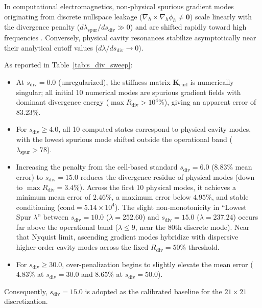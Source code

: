 \documentclass[VANCOUVER]{USG}
\begin{document}
In computational electromagnetics, non-physical spurious gradient modes originating from discrete nullspace leakage ($\nabla_h \times \nabla_h \phi_h \neq \mathbf{0}$) scale linearly with the divergence penalty ($d\lambda_{\mathrm{spur}} / ds_{\mathrm{div}} \gg 0$) and are shifted rapidly toward high frequencies \cite{jin2014finite, costabel2002weighted, bossavit1990spurious}. Conversely, physical cavity resonances stabilize asymptotically near their analytical cutoff values ($d\lambda / ds_{\mathrm{div}} \to 0$).

As reported in Table~\ref{tab:s_div_sweep}:
\begin{itemize}
    \item At $s_{\mathrm{div}} = 0.0$ (unregularized), the stiffness matrix $\mathbf{K}_{\mathrm{curl}}$ is numerically singular; all initial 10 numerical modes are spurious gradient fields with dominant divergence energy ($\max R_{\mathrm{div}} > 10^4\%$), giving an apparent error of $83.23\%$.
    \item For $s_{\mathrm{div}} \ge 4.0$, all 10 computed states correspond to physical cavity modes, with the lowest spurious mode shifted outside the operational band ($\lambda_{\mathrm{spur}} > 78$).
    \item Increasing the penalty from the cell-based standard $s_{\mathrm{div}} = 6.0$ ($8.83\%$ mean error) \cite{stable_vnmm2d_2026} to $s_{\mathrm{div}} = 15.0$ reduces the divergence residue of physical modes (down to $\max R_{\mathrm{div}} = 3.4\%$). Across the first 10 physical modes, it achieves a minimum mean error of $\mathbf{2.46\%}$, a maximum error below $4.95\%$, and stable conditioning ($\mathrm{cond} = 5.14 \times 10^4$). The slight non-monotonicity in ``Lowest Spur $\lambda$'' between $s_{\mathrm{div}} = 10.0$ ($\lambda = 252.60$) and $s_{\mathrm{div}} = 15.0$ ($\lambda = 237.24$) occurs far above the operational band ($\lambda \le 9$, near the 80th discrete mode). Near that Nyquist limit, ascending gradient modes hybridize with dispersive higher-order cavity modes across the fixed $R_{\mathrm{div}} = 50\%$ threshold.
    \item For $s_{\mathrm{div}} \ge 30.0$, over-penalization begins to slightly elevate the mean error ($4.83\%$ at $s_{\mathrm{div}} = 30.0$ and $8.65\%$ at $s_{\mathrm{div}} = 50.0$).
\end{itemize}
Consequently, $s_{\mathrm{div}} = 15.0$ is adopted as the calibrated baseline for the $21 \times 21$ discretization.
\end{document}
